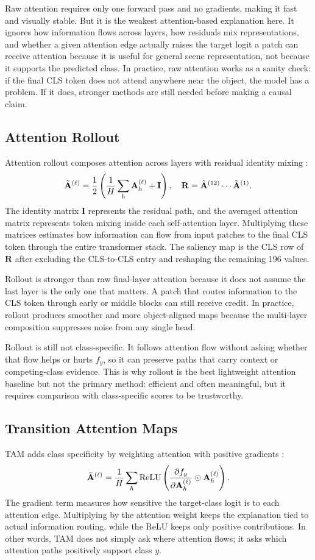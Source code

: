 \documentclass[10pt]{article}
\begin{document}
Raw attention requires only one forward pass and no gradients, making it fast and visually stable. But it is the weakest attention-based explanation here. It ignores how information flows across layers, how residuals mix representations, and whether a given attention edge actually raises the target logit a patch can receive attention because it is useful for general scene representation, not because it supports the predicted class. In practice, raw attention works as a sanity check: if the final CLS token does not attend anywhere near the object, the model has a problem. If it does, stronger methods are still needed before making a causal claim.

\subsection{Attention Rollout}
Attention rollout composes attention across layers with residual identity mixing \cite{abnar2020quantifying}:
\[
\tilde{\mathbf{A}}^{(\ell)}={1\over2}\left({1\over H}\sum_h\mathbf{A}^{(\ell)}_h+\mathbf{I}\right),
\quad
\mathbf{R}=\tilde{\mathbf{A}}^{(12)}\cdots\tilde{\mathbf{A}}^{(1)}.
\]
The identity matrix $\mathbf{I}$ represents the residual path, and the averaged attention matrix represents token mixing inside each self-attention layer. Multiplying these matrices estimates how information can flow from input patches to the final CLS token through the entire transformer stack. The saliency map is the CLS row of $\mathbf{R}$ after excluding the CLS-to-CLS entry and reshaping the remaining 196 values.

Rollout is stronger than raw final-layer attention because it does not assume the last layer is the only one that matters. A patch that routes information to the CLS token through early or middle blocks can still receive credit. In practice, rollout produces smoother and more object-aligned maps because the multi-layer composition suppresses noise from any single head.

Rollout is still not class-specific. It follows attention flow without asking whether that flow helps or hurts $f_y$, so it can preserve paths that carry context or competing-class evidence. This is why rollout is the best lightweight attention baseline but not the primary method: efficient and often meaningful, but it requires comparison with class-specific scores to be trustworthy.

\subsection{Transition Attention Maps}
TAM adds class specificity by weighting attention with positive gradients \cite{yuan2021tam}:
\[
\bar{\mathbf{A}}^{(\ell)}={1\over H}\sum_h
\mathrm{ReLU}\left({\partial f_y\over\partial \mathbf{A}^{(\ell)}_h}
\odot \mathbf{A}^{(\ell)}_h\right).
\]
The gradient term measures how sensitive the target-class logit is to each attention edge. Multiplying by the attention weight keeps the explanation tied to actual information routing, while the ReLU keeps only positive contributions. In other words, TAM does not simply ask where attention flows; it asks which attention paths positively support class $y$.
\end{document}

